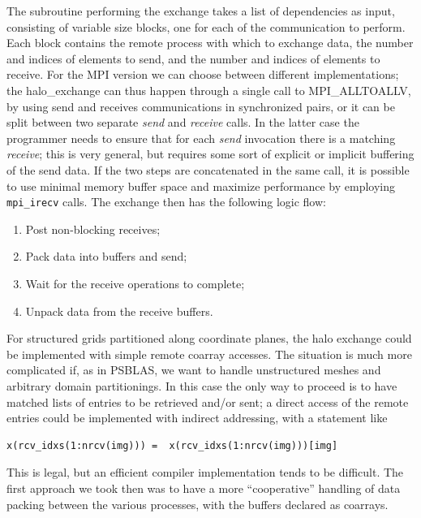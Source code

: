 \documentclass{IOS-Book-Article}
\begin{document}
The subroutine performing the exchange takes a list of dependencies as
input, consisting  of variable size blocks, one for each of the
communication to perform. Each  block contains the remote process with
which to  exchange data, the number and indices of elements to send,
and the number and indices of elements to receive.
For the MPI version we can choose between different implementations; 
the halo\_exchange can thus happen through a single call to
MPI\_ALLTOALLV, by using send and receives communications in
synchronized pairs, or it can be split between 
two separate \emph{send} and \emph{receive} calls. In the latter case
the programmer needs to ensure that for each \emph{send} invocation
there is a matching \emph{receive}; this is very general, but requires
some sort of explicit or implicit buffering of the send data. 
If the two steps are concatenated in the same call, it is possible to
use minimal memory buffer space and maximize performance by employing 
\verb|mpi_irecv| calls.
The exchange then has the following logic flow: 
\begin{enumerate}
  \item Post non-blocking receives;
  \item Pack data into buffers and send; 
  \item Wait for the receive operations to complete; 
  \item Unpack data from the receive buffers. 
\end{enumerate} 
For structured grids partitioned along coordinate planes, the halo
exchange could be implemented with simple remote coarray accesses. The
situation is much more complicated if, as in PSBLAS, we want to handle
unstructured meshes and arbitrary domain partitionings. In this  case
the only way to proceed is to have matched lists of entries to be
retrieved and/or sent; a direct access of the remote entries could be
implemented with indirect addressing, with a statement like
\lstset{language=Fortran} 
{\small
\begin{lstlisting}
x(rcv_idxs(1:nrcv(img))) =  x(rcv_idxs(1:nrcv(img)))[img]
\end{lstlisting}}
This is  legal, but an efficient  compiler implementation tends to be
difficult.  The first approach we took then was to 
have a more ``cooperative'' handling of data packing between the
various processes, with the buffers declared as coarrays. 
\end{document}

